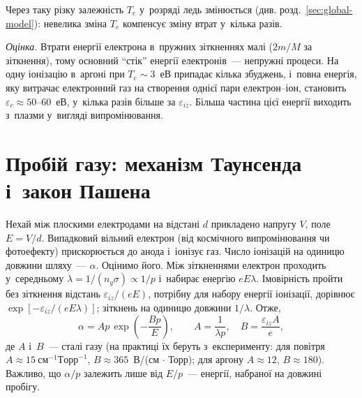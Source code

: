 Через таку різку залежність $T_e$ у~розряді ледь змінюється
(див. розд.~\ref{sec:global-model}): невелика зміна $T_e$ компенсує зміну втрат у~кілька разів.

\emph{Оцінка.} Втрати енергії електрона в~пружних зіткненнях малі ($2m/M$ за зіткнення), тому
основний \enquote{стік} енергії електронів~--- непружні процеси. На одну іонізацію в~аргоні
при $T_e\sim3$~еВ припадає кілька збуджень, і~повна енергія, яку витрачає електронний газ на
створення однієї пари електрон--іон, становить $\varepsilon_c\approx50$--$60$~еВ, у~кілька разів більше
за $\varepsilon_{iz}$. Більша частина цієї енергії виходить з~плазми у~вигляді випромінювання.

\section{Пробій газу: механізм Таунсенда і~закон Пашена}\label{sec:townsend}

Нехай між плоскими електродами на відстані $d$ прикладено напругу $V$, поле $E=V/d$.
Випадковий вільний електрон (від космічного випромінювання чи фотоефекту) прискорюється
до анода і~іонізує газ. Число іонізацій на одиницю довжини шляху~---  $\alpha$. Оцінимо його. Між зіткненнями електрон проходить у~середньому
$\lambda=1/(n_g\sigma)\propto1/p$ і~набирає енергію $eE\lambda$. Імовірність пройти без
зіткнення відстань $\varepsilon_{iz}/(eE)$, потрібну для набору енергії іонізації, дорівнює
$\exp[-\varepsilon_{iz}/(eE\lambda)]$; зіткнень на одиницю довжини $1/\lambda$. Отже,
\begin{equation}\label{eq:townsend-alpha}
	\alpha=Ap\,\exp\left(-\frac{Bp}{E}\right),\qquad A=\frac1{\lambda p},\quad B=\frac{\varepsilon_{iz}A}{e},
\end{equation}
де $A$ і~$B$~--- сталі газу (на практиці їх беруть з~експерименту: для повітря
$A\approx15~\mathrm{см}^{-1}\mathrm{Торр}^{-1}$, $B\approx365$~В/(см$\,\cdot\,$Торр); для аргону $A\approx12$,
$B\approx180$). Важливо, що $\alpha/p$ залежить лише від $E/p$~--- енергії, набраної на довжині пробігу.

